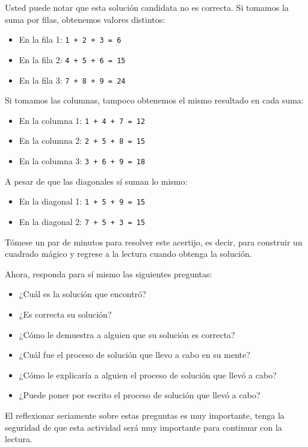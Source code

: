 Usted puede notar que esta solución candidata no es correcta. Si tomamos la suma por filas, obtenemos valores distintos:

\begin{itemize}
	\item En la fila 1: \texttt{1 + 2 + 3 = 6}
	\item En la fila 2: \texttt{4 + 5 + 6 = 15}
	\item En la fila 3: \texttt{7 + 8 + 9 = 24}
\end{itemize}

Si tomamos las columnas, tampoco obtenemos el mismo resultado en 
cada suma:

\begin{itemize}
	\item En la columna 1: \texttt{1 + 4 + 7 = 12}
	\item En la columna 2: \texttt{2 + 5 + 8 = 15}
	\item En la columna 3: \texttt{3 + 6 + 9 = 18}
\end{itemize}

A pesar de que las diagonales sí suman lo mismo:

\begin{itemize}
	\item En la diagonal 1: \texttt{1 + 5 + 9 = 15}
	\item En la diagonal 2: \texttt{7 + 5 + 3 = 15}
\end{itemize}

Tómese un par de minutos para resolver este acertijo, es decir, para construir 
un cuadrado mágico y regrese a la lectura cuando obtenga la solución. 

Ahora, responda para sí mismo las siguientes preguntas:

\begin{itemize}
	\item ¿Cuál es la solución que encontró?
	\item ¿Es correcta su solución?
	\item ¿Cómo le demuestra a alguien que su solución es correcta?
	\item ¿Cuál fue el proceso de solución que llevo a cabo en su mente?
	\item ¿Cómo le explicaría a alguien el proceso de solución que llevó a cabo?
	\item ¿Puede poner por escrito el proceso de solución que llevó	a cabo?
\end{itemize}

El reflexionar seriamente sobre estas preguntas es muy importante,
tenga la seguridad de que esta actividad será muy importante para 
continuar con la lectura.

